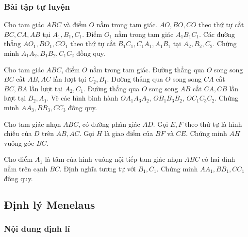 \subsubsection{Bài tập tự luyện}

\begin{bt}%
	Cho tam giác $ABC$ và điểm $O$ nằm trong tam giác. $AO,BO,CO$ theo thứ tự cắt $BC,CA,AB$ tại $A_1,B_1,C_1$. Điểm $O_1$ nằm trong tam giác $A_1B_1C_1$. Các đường thẳng $AO_1,BO_1,CO_1$ theo thứ tự cắt $B_1C_1,C_1A_1,A_1B_1$ tại $A_2,B_2,C_2$. Chứng minh $A_1A_2,B_1B_2,C_1C_2$ đồng quy.
	\loigiai{
		
	}
\end{bt}

\begin{bt}%
	Cho tam giác $ABC$, điểm $O$ nằm trong tam giác. Đường thẳng qua $O$ song song $BC$ cắt $AB, AC$ lần lượt tại $C_2,B_1$. Đường thẳng qua $O$ song song $CA$ cắt $BC, BA$ lần lượt tại $A_2,C_1$. Đường thẳng qua $O$ song song $AB$ cắt $CA, CB$ lần lượt tại $B_2,A_1$. Vẽ các hình bình hành $OA_1A_3A_2$, $OB_1B_3B_2$, $OC_1C_3C_2$. Chứng minh $AA_3,BB_3,CC_3$ đồng quy.
	\loigiai{
		
	}
\end{bt}

\begin{bt}%
	Cho tam giác nhọn $ABC$, có đường phân giác $AD$. Gọi $E, F$ theo thứ tự là hình chiếu của $D$ trên $AB, AC$. Gọi $H$ là giao điểm của $BF$ và $CE$. Chứng minh $AH$ vuông góc $BC$.
	\loigiai{
		
	}
\end{bt}

\begin{bt}%
	Cho điểm $A_1$ là tâm của hình vuông nội tiếp tam giác nhọn $ABC$ có hai đỉnh nằm trên cạnh $BC$. Định nghĩa tương tự với $B_1, C_1$. Chứng minh $AA_1, BB_1, CC_1$ đồng quy.
	\loigiai{
		
	}
\end{bt}

\subsection{Định lý Menelaus}

\subsubsection{Nội dung định lí}

